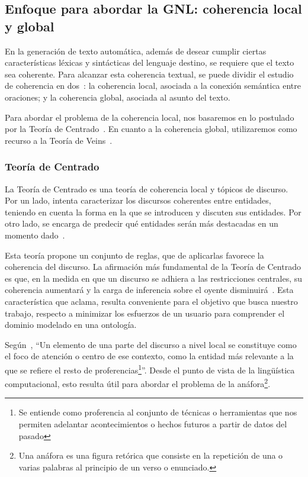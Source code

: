 \subsection{Enfoque para abordar la GNL: coherencia local y global}
En la generación de texto automática, además de desear cumplir ciertas características léxicas y sintácticas del lenguaje destino, se requiere que el texto sea coherente. Para alcanzar esta coherencia textual, se puede dividir el estudio de coherencia en dos~\cite{van2005estructuras}: la coherencia local, asociada a la conexión semántica entre oraciones; y la coherencia global, asociada al asunto del texto.

Para abordar el problema de la coherencia local, nos basaremos en lo postulado por la Teoría de Centrado~\cite{grosz1986towards}.
En cuanto a la coherencia global, utilizaremos como recurso a la Teoría de Veins~\cite{cristea1998veins}.

\subsubsection{Teoría de Centrado}
La Teoría de Centrado es una teoría de coherencia local y tópicos de discurso. Por un lado, intenta caracterizar los discursos coherentes entre entidades, teniendo en cuenta la forma en la que se introducen y discuten sus entidades. Por otro lado, se encarga de predecir qué entidades serán más destacadas en un momento dado~\cite{poesio2004centering}.

Esta teoría propone un conjunto de reglas, que de aplicarlas favorece la coherencia del discurso. La afirmación más fundamental de la Teoría de Centrado es que, en la medida en que un discurso se adhiera a las restricciones centrales, su coherencia aumentará y la carga de inferencia sobre el oyente disminuirá~\cite{kruijff1997topics}. Esta característica que aclama, resulta conveniente para el objetivo que busca nuestro trabajo, respecto a minimizar los esfuerzos de un usuario para comprender el dominio modelado en una ontología.

Según~\cite{vicente2015generacion}, ``Un elemento de una parte del discurso a nivel local se constituye como el foco de atención o centro de ese contexto, como la entidad más relevante a la que se refiere el resto de proferencias\footnote{Se entiende como proferencia al conjunto de técnicas o herramientas que nos permiten adelantar acontecimientos o hechos futuros a partir de datos del pasado}''. Desde el punto de vista de la lingüística computacional, esto resulta útil para abordar el problema de la anáfora\footnote{Una anáfora es una figura retórica que consiste en la repetición de una o varias palabras al principio de un verso o enunciado.}. 

